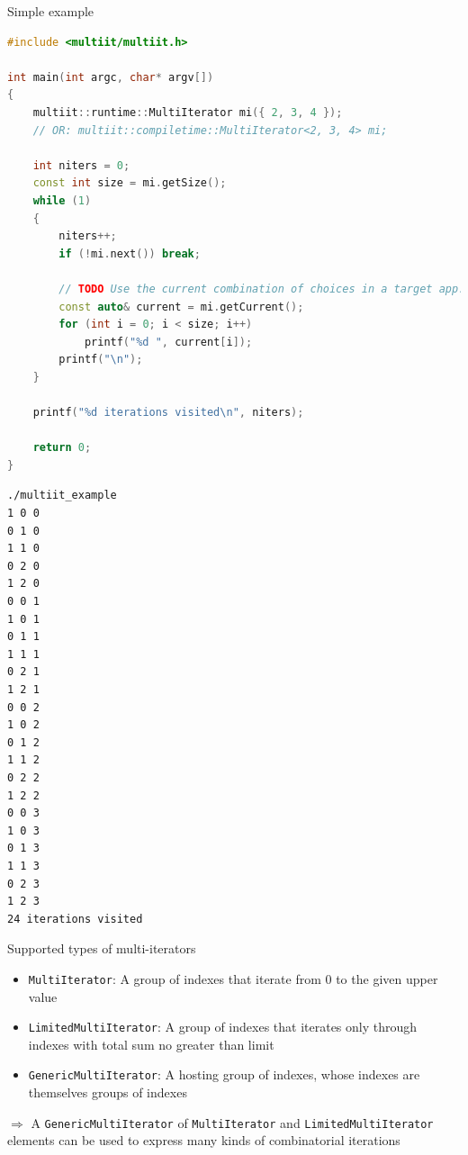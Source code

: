 \documentclass[aspectratio=169,twoside]{beamer}
\begin{document}
\begin{frame}[fragile]{Simple example}

\begin{minipage}{9cm}
\begin{lstlisting}[basicstyle=\tiny\ttfamily, language=c++]
#include <multiit/multiit.h>

int main(int argc, char* argv[])
{
    multiit::runtime::MultiIterator mi({ 2, 3, 4 }); 
    // OR: multiit::compiletime::MultiIterator<2, 3, 4> mi; 

    int niters = 0;
    const int size = mi.getSize();
    while (1) 
    {   
        niters++;
        if (!mi.next()) break;

        // TODO Use the current combination of choices in a target app.
        const auto& current = mi.getCurrent();
        for (int i = 0; i < size; i++)
            printf("%d ", current[i]);
        printf("\n");
    }   

    printf("%d iterations visited\n", niters);

    return 0;
}
\end{lstlisting}
\end{minipage}%
\begin{minipage}{0.5cm}
\hskip0.5cm
\end{minipage}%
\begin{minipage}{5cm}
\begin{lstlisting}[basicstyle=\tiny\ttfamily]
./multiit_example                     
1 0 0 
0 1 0 
1 1 0 
0 2 0 
1 2 0 
0 0 1 
1 0 1 
0 1 1 
1 1 1 
0 2 1 
1 2 1 
0 0 2 
1 0 2 
0 1 2 
1 1 2 
0 2 2 
1 2 2 
0 0 3 
1 0 3 
0 1 3 
1 1 3 
0 2 3 
1 2 3 
24 iterations visited
\end{lstlisting}
\end{minipage}

\end{frame}



\begin{frame}[fragile]{Supported types of multi-iterators}

\begin{itemize}
\item \texttt{MultiIterator}: A group of indexes that iterate from 0 to the given upper value
\item \texttt{LimitedMultiIterator}: A group of indexes that iterates only through indexes with total sum no greater than limit
\item \texttt{GenericMultiIterator}: A hosting group of indexes, whose indexes are themselves groups of indexes
\end{itemize}

\vskip20pt

$\Rightarrow$ A \texttt{GenericMultiIterator} of \texttt{MultiIterator} and \texttt{LimitedMultiIterator} elements can be used to express many kinds of combinatorial iterations

\end{frame}
\end{document}
